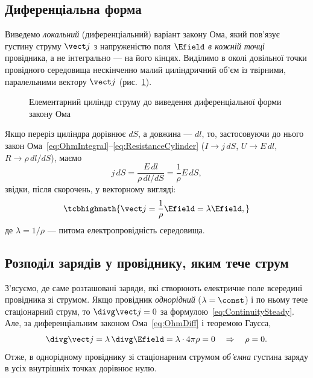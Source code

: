 \subsection*{Диференціальна форма}

Виведемо \emph{локальний} (диференціальний) варіант закону Ома, який пов'язує густину струму $\vect j$ з напруженістю поля $\Efield$ \emph{в
	кожній точці} провідника, а не інтегрально --- на його кінцях. Виділимо в околі довільної точки провідного середовища нескінченно малий
циліндричний об'єм із твірними, паралельними вектору $\vect j$ (рис.~\ref{pic:DiffOhmLaw}).

\begin{figure}\centering
	\caption{Елементарний циліндр струму до виведення диференціальної форми закону Ома\label{pic:DiffOhmLaw}}
\end{figure}

Якщо переріз циліндра дорівнює $dS$, а довжина --- $dl$, то, застосовуючи до нього закон
Ома~\eqref{eq:OhmIntegral}--\eqref{eq:ResistanceCylinder} ($I \to j\, dS$, $U \to E\, dl$, $R \to \rho\, dl/dS$), маємо
\begin{equation*}
	j\, dS = \frac{E\, dl}{\rho\, dl/dS} = \frac1\rho E\, dS,
\end{equation*}
звідки, після скорочень, у векторному вигляді:
\begin{equation}\label{eq:OhmDiff}
	\tcbhighmath{
		\vect j = \frac1\rho \Efield = \lambda\Efield,
	}
\end{equation}
де $\lambda = 1/\rho$ --- питома електропровідність середовища.


\subsection*{Розподіл зарядів у провіднику, яким тече струм}

З'ясуємо, де саме розташовані заряди, які створюють електричне поле всередині провідника зі струмом. Якщо провідник \emph{однорідний}
($\lambda = \const$) і по ньому тече стаціонарний струм, то $\divg\vect j = 0$ за формулою~\eqref{eq:ContinuitySteady}. Але, за диференціальним
законом Ома~\eqref{eq:OhmDiff} і теоремою Гаусса,
\begin{equation}\label{eq:VolumeChargeZero}
	\divg\vect j = \lambda\,\divg\Efield = \lambda\cdot 4\pi\rho = 0 \quad\Rightarrow\quad \rho = 0.
\end{equation}
Отже, в однорідному провіднику зі стаціонарним струмом \emph{об'ємна} густина заряду в усіх внутрішніх точках дорівнює нулю.

